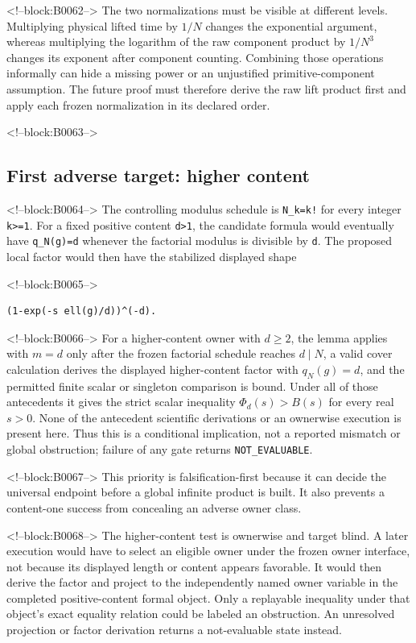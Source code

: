\documentclass[11pt]{article}
\begin{document}
<!--block:B0062-->
The two normalizations must be visible at different levels. Multiplying
physical lifted time by $1/N$ changes the exponential argument, whereas
multiplying the logarithm of the raw component product by $1/N^3$
changes its exponent after component counting. Combining those
operations informally can hide a missing power or an unjustified
primitive-component assumption. The future proof must therefore derive
the raw lift product first and apply each frozen normalization in its
declared order.

<!--block:B0063-->
\hypertarget{42-first-adverse-target-higher-content}{%
\subsection{First adverse target: higher
content}\label{42-first-adverse-target-higher-content}}

<!--block:B0064-->
The controlling modulus schedule is \texttt{N\_k=k!} for every integer
\texttt{k\textgreater{}=1}. For a fixed positive content
\texttt{d\textgreater{}1}, the candidate formula would eventually have
\texttt{q\_N(g)=d} whenever the factorial modulus is divisible by
\texttt{d}. The proposed local factor would then have the stabilized
displayed shape

<!--block:B0065-->
\begin{verbatim}
(1-exp(-s ell(g)/d))^(-d).
\end{verbatim}

<!--block:B0066-->
For a higher-content owner with \(d\geq2\), the lemma applies with
\(m=d\) only after the frozen factorial schedule reaches \(d\mid N\), a valid
cover calculation derives the displayed higher-content factor with
\(q_N(g)=d\), and the permitted finite scalar or singleton comparison is bound.
Under all of those antecedents it gives the strict scalar inequality
\(\Phi_d(s)>B(s)\) for every real \(s>0\).  None of the antecedent scientific
derivations or an ownerwise execution is present here.  Thus this is a conditional
implication, not a reported mismatch or global obstruction; failure of any gate
returns \texttt{NOT\_EVALUABLE}.

<!--block:B0067-->
This priority is falsification-first because it can decide the universal
endpoint before a global infinite product is built. It also prevents a
content-one success from concealing an adverse owner class.

<!--block:B0068-->
The higher-content test is ownerwise and target blind. A later execution
would have to select an eligible owner under the frozen owner interface,
not because its displayed length or content appears favorable. It would
then derive the factor and project to the independently named owner
variable in the completed positive-content formal object. Only a
replayable inequality under that object's exact equality relation could
be labeled an obstruction. An unresolved projection or factor
derivation returns a not-evaluable state instead.
\end{document}
